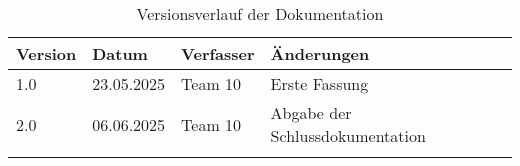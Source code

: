 \documentclass{scrarticle}                %
\begin{document}
\begin{longtable}{|p{2cm}|p{3cm}|p{3cm}|p{5cm}|}
	\hline
	\textbf{Version} & \textbf{Datum} & \textbf{Verfasser} & \textbf{Änderungen} \\
	\hline
	1.0              & 23.05.2025     & Team 10            & Erste Fassung                 \\
	2.0              & 06.06.2025     & Team 10            & Abgabe der Schlussdokumentation	 \\
	\hline
	\caption{Versionsverlauf der Dokumentation}
\end{longtable}

\newpage


\thispagestyle{nofooter}
\newpage


\newpage

\tableofcontents
\thispagestyle{nofooter}
\newpage

\setcounter{page}{1}


\newpage

%


\newpage


\newpage


\newpage


\newpage


\newpage


\newpage
\end{document}
